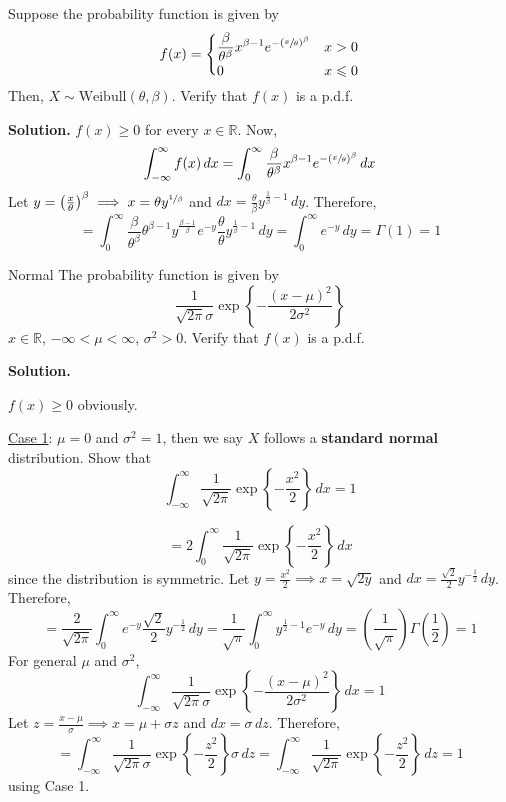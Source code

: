 \begin{Example}{}{}
    Suppose the probability function is given by
    \[ f(x)=\begin{dcases}
            \frac{\beta}{\theta^\beta}x^{\beta-1}e^{-\left( \sfrac{x}{\theta}  \right)^\beta} & x>0          \\
            0                                                                                 & x\leqslant 0
        \end{dcases} \]
    Then, $ X \sim \text{Weibull}(\theta,\beta) $. Verify that $ f(x) $ is a p.d.f.

    \textbf{Solution.} $ f(x)\geqslant 0 $ for every $ x\in\mathbb{R} $. Now,
    \[ \displaystyle \int_{-\infty}^{\infty} f(x)\, d{x} =
        \int_{0}^{\infty} \frac{\beta}{\theta^\beta}x^{\beta-1}e^{-\left( \sfrac{x}{\theta}  \right)^\beta} \, d{x} \]
    Let $ y=\left( \frac{x}{\theta}  \right)^\beta \implies
        x=\theta y^{\sfrac{1}{\beta}} $ and $ dx=\frac{\theta}{\beta} y^{\frac{1}{\beta}-1}\,dy $.
    Therefore,
    \[ =\int_{0}^{\infty} \frac{\beta}{\theta^\beta} \theta^{\beta-1}
        y^{\frac{\beta-1}{\beta}}e^{-y}\frac{\theta}{\theta} y^{\frac{1}{\beta} -1}\, d{y}
        =\int_{0}^{\infty} e^{-y}\, d{y}=\Gamma(1)=1  \]
\end{Example}

\begin{Example}{Normal}{}
    The probability function is given by
    \[ \frac{1}{\sqrt{2\pi}\sigma}\exp\left\{ -\frac{(x-\mu)^2}{2\sigma^2} \right\}  \]
    $ x\in\mathbb{R} $, $ -\infty<\mu<\infty $, $ \sigma^2>0 $.
    Verify that $ f(x) $ is a p.d.f.

    \textbf{Solution.}

    $ f(x)\geqslant 0 $ obviously.

    \underline{Case 1}: $ \mu=0 $ and $ \sigma^2=1 $, then
    we say $ X $ follows a \textbf{standard normal} distribution.
    Show that
    \[ \int_{-\infty}^{\infty} \frac{1}{\sqrt{2\pi}}\exp\left\{ -\frac{x^2}{2} \right\} \, d{x}=1  \]

    \[ =2\int_{0}^{\infty} \frac{1}{\sqrt{2\pi}}\exp\left\{ -\frac{x^2}{2} \right\} \, d{x}  \]
    since the distribution is symmetric. Let $ y=\frac{x^2}{2}\implies x=\sqrt{2y} $
    and $ dx=\frac{\sqrt{2}}{2} y^{-\frac{1}{2}}\,dy $. Therefore,
    \[ =\frac{2}{\sqrt{2\pi}}\int_{0}^{\infty} e^{-y}\frac{\sqrt{2}}{2} y^{-\frac{1}{2}}\, d{y}
        =\frac{1}{\sqrt{\pi}}\int_{0}^{\infty} y^{\frac{1}{2}-1}e^{-y}\, d{y}=
        \left( \frac{1}{\sqrt{\pi}}  \right)\Gamma\left( \frac{1}{2} \right)=1    \]
    For general $ \mu $ and $ \sigma^2 $,
    \[ \int_{-\infty}^{\infty}  \frac{1}{\sqrt{2\pi}\sigma}\exp\left\{ -\frac{(x-\mu)^2}{2\sigma^2} \right\} \, d{x}=1 \]
    Let $ z=\frac{x-\mu}{\sigma}\implies x=\mu+\sigma z  $
    and $ dx=\sigma\,dz $. Therefore,
    \[ =\int_{-\infty}^{\infty} \frac{1}{\sqrt{2\pi}\sigma}
        \exp\left\{ -\frac{z^2}{2}\right\}\sigma \, d{z}=
        \int_{-\infty}^{\infty} \frac{1}{\sqrt{2\pi}}\exp\left\{ -\frac{z^2}{2} \right\} \, d{z}=1   \]
    using Case 1.
\end{Example}

